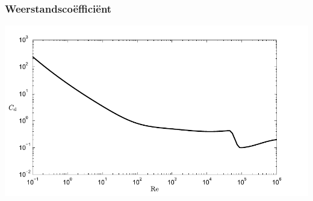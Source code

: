 \documentclass[t]{beamer}
\begin{document}
  	\begin{frame}
  		\frametitle{Weerstandscoëfficiënt}
  		\center
  		\includegraphics[width=\textwidth]{../fig/uitwendige_stroming/Cilinderstroming_Cd}
  	\end{frame}
\end{document}
